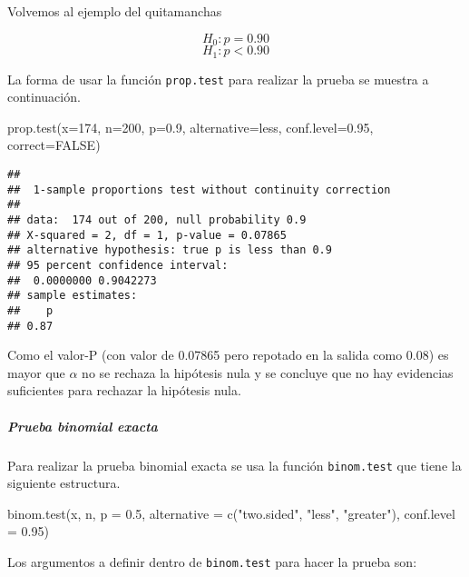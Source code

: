 \documentclass[
]{article}
\newenvironment{Shaded}{}{}
\newcommand{\AttributeTok}[1]{\textcolor[rgb]{0.49,0.56,0.16}{#1}}
\newcommand{\ConstantTok}[1]{\textcolor[rgb]{0.53,0.00,0.00}{#1}}
\newcommand{\DecValTok}[1]{\textcolor[rgb]{0.25,0.63,0.44}{#1}}
\newcommand{\FloatTok}[1]{\textcolor[rgb]{0.25,0.63,0.44}{#1}}
\newcommand{\FunctionTok}[1]{\textcolor[rgb]{0.02,0.16,0.49}{#1}}
\newcommand{\NormalTok}[1]{#1}
\newcommand{\StringTok}[1]{\textcolor[rgb]{0.25,0.44,0.63}{#1}}
\begin{document}
Volvemos al ejemplo del quitamanchas

\[H_0: p = 0.90\] \[H_1: p < 0.90\]

La forma de usar la función \texttt{prop.test} para realizar la prueba
se muestra a continuación.

\begin{Shaded}
\begin{Highlighting}[]
\FunctionTok{prop.test}\NormalTok{(}\AttributeTok{x=}\DecValTok{174}\NormalTok{, }\AttributeTok{n=}\DecValTok{200}\NormalTok{, }\AttributeTok{p=}\FloatTok{0.9}\NormalTok{, }\AttributeTok{alternative=}\StringTok{\textquotesingle{}less\textquotesingle{}}\NormalTok{,}
          \AttributeTok{conf.level=}\FloatTok{0.95}\NormalTok{, }\AttributeTok{correct=}\ConstantTok{FALSE}\NormalTok{)}
\end{Highlighting}
\end{Shaded}

\begin{verbatim}
## 
##  1-sample proportions test without continuity correction
## 
## data:  174 out of 200, null probability 0.9
## X-squared = 2, df = 1, p-value = 0.07865
## alternative hypothesis: true p is less than 0.9
## 95 percent confidence interval:
##  0.0000000 0.9042273
## sample estimates:
##    p 
## 0.87
\end{verbatim}

Como el valor-P (con valor de 0.07865 pero repotado en la salida como
0.08) es mayor que \(\alpha\) no se rechaza la hipótesis nula y se
concluye que no hay evidencias suficientes para rechazar la hipótesis
nula.

\hypertarget{prueba-binomial-exacta}{%
\subparagraph{Prueba binomial exacta}\label{prueba-binomial-exacta}}

Para realizar la prueba binomial exacta se usa la función
\texttt{binom.test} que tiene la siguiente estructura.

\begin{Shaded}
\begin{Highlighting}[]
\FunctionTok{binom.test}\NormalTok{(x, n, }\AttributeTok{p =} \FloatTok{0.5}\NormalTok{,}
           \AttributeTok{alternative =} \FunctionTok{c}\NormalTok{(}\StringTok{"two.sided"}\NormalTok{, }\StringTok{"less"}\NormalTok{, }\StringTok{"greater"}\NormalTok{),}
           \AttributeTok{conf.level =} \FloatTok{0.95}\NormalTok{)}
\end{Highlighting}
\end{Shaded}

Los argumentos a definir dentro de \texttt{binom.test} para hacer la
prueba son:
\end{document}
